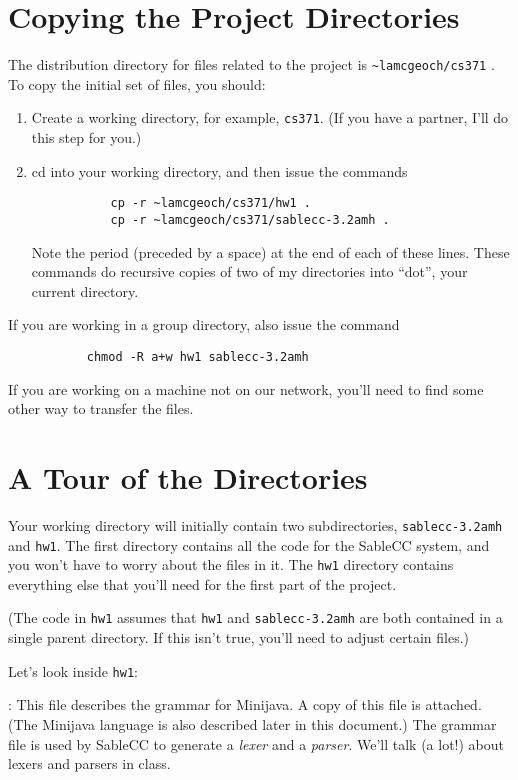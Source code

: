 \documentclass[11pt]{article}
\begin{document}
\section{Copying the Project Directories}
The distribution directory for files related to the project is \verb'~lamcgeoch/cs371' . To copy the initial set of files, you should:
\begin{enumerate}
\item Create a working directory, for example, \verb'cs371'.  (If you have a partner, I'll do this step for you.)
\item cd into your working directory, and then issue the commands
\begin{verbatim}
           cp -r ~lamcgeoch/cs371/hw1 .
           cp -r ~lamcgeoch/cs371/sablecc-3.2amh .
\end{verbatim}
Note the period (preceded by a space) at the end of each of these lines.  These commands do recursive copies of two of my directories into ``dot'', your current directory.
\end{enumerate}
If you are working in a group directory, also issue the command
\begin{verbatim}
           chmod -R a+w hw1 sablecc-3.2amh
\end{verbatim}

If you are working on a machine not on our network, you'll need to find some other way to transfer the files.

\section{A Tour of the Directories}
Your working directory will initially contain two subdirectories, \verb'sablecc-3.2amh' and \verb'hw1'.  The first directory contains all the code for the SableCC system, and you won't have to worry about the files in it.  The \verb'hw1' directory contains everything else that you'll need for the first part of the project.

(The code in \verb'hw1' assumes that \verb'hw1' and \verb'sablecc-3.2amh' are both contained in a single parent directory.  If this isn't true, you'll need to adjust certain files.)

\mbox{}\par Let's look inside \verb'hw1': \par \mbox{}

:  This file describes the grammar for Minijava.  A copy of this file is attached.  (The Minijava language is also described later in this document.)  The grammar file is used by SableCC to generate a {\em lexer} and a {\em parser}.  We'll talk (a lot!) about lexers and parsers in class.
\end{document}
